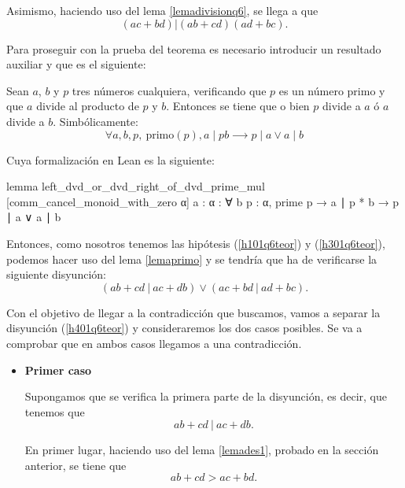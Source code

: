 \begin{demostracion}
  Asimismo, haciendo uso del lema \ref{lemadivisionq6}, se llega a que
  \begin{equation}\tag{h3}\label{h301q6teor}
    (ac+bd) | (ab+cd)(ad+bc).
  \end{equation}

  Para proseguir con la prueba del teorema es necesario introducir un
  resultado auxiliar y que es el siguiente:
  \begin{lema}\label{lemaprimo}
    Sean \(a\), \(b\) y \(p\) tres números cualquiera, verificando que \(p\)
    es un número primo y que \(a\) divide al producto de \(p\) y \(b\).
    Entonces se tiene que o bien \(p\) divide a \(a\) ó \(a\) divide a \(b\).
    Simbólicamente:
    \begin{equation}
      ∀ a,b,p, \ \text{primo}(p), a∣pb ⟶ p∣a \lor a∣b
    \end{equation}
  \end{lema}

  Cuya formalización en Lean es la siguiente:
  \begin{leancode}
  lemma left_dvd_or_dvd_right_of_dvd_prime_mul
  [comm_cancel_monoid_with_zero α] {a : α} :
  ∀ {b p : α}, prime p → a ∣ p * b → p ∣ a ∨ a ∣ b
  \end{leancode}

  Entonces, como nosotros tenemos las hipótesis (\ref{h101q6teor}) y
  (\ref{h301q6teor}), podemos hacer uso del lema \ref{lemaprimo} y se tendría
  que ha de verificarse la siguiente disyunción:
  \begin{equation}\tag{h4}\label{h401q6teor}
    (ab+cd\ |\ ac+db) \lor (ac+bd\ |\ ad+bc).
  \end{equation}

  Con el objetivo de llegar a la contradicción que buscamos, vamos a separar
  la disyunción (\ref{h401q6teor}) y consideraremos los dos casos posibles.
  Se va a comprobar que en ambos casos llegamos a una contradicción.
  \begin{itemize}
  \item \textbf{Primer caso}

    Supongamos que se verifica la primera parte de la disyunción, es decir,
    que tenemos que
    \begin{equation}\tag{hj}\label{hj01q6teor}
      ab+cd\ |\ ac+db.
    \end{equation}

    En primer lugar, haciendo uso del lema \ref{lemades1}, probado en la
    sección anterior, se tiene que
    \begin{equation}\tag{hj1}\label{hj101q6}
      ab+cd > ac+bd.
    \end{equation}


\end{itemize}
\end{demostracion}
